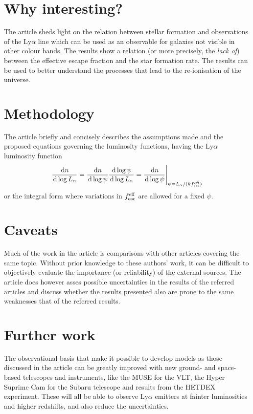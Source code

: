 \documentclass[a4paper,11pt]{article}
\newcommand{\diff}{\ensuremath{\; \text{d}}}
\begin{document}
\section{Why interesting?}
The article sheds light on the relation between stellar formation and observations of the Ly$\alpha$ line which can be used as an observable for galaxies not visible in other colour bands. The results show a relation (or more precisely, the \textit{lack of}) between the effective escape fraction and the star formation rate. The results can be used to better understand the processes that lead to the re-ionisation of the universe. 


\section{Methodology}
The article briefly and concisely describes the assumptions made and the proposed equations governing the luminosity functions, having the Ly$\alpha$ luminosity function
\begin{equation}
    \frac{\!\diff n}{\!\diff \log L_\alpha} = \frac{\!\diff n}{\!\diff \log \psi} \frac{\! \diff \log \psi}{\! \diff \log L_\alpha} = \frac{\! \diff n}{\!\diff \log \psi}\Bigg|_{\psi=L_\alpha / (kf_{\rm esc}^{\rm eff})}
    \label{eq:lumfunc}
\end{equation}
or the integral form where variations in $f_{\rm esc}^{\rm eff}$ are allowed for a fixed $\psi$. 

\section{Caveats}
Much of the work in the article is comparisons with other articles covering the same topic. Without prior knowledge to these authors' work, it can be difficult to objectively evaluate the importance (or reliability) of the external sources. The article does however asses possible uncertainties in the results of the referred articles and discuss whether the results presented also are prone to the same weaknesses that of the referred results.

\section{Further work}
The observational basis that make it possible to develop models as those discussed in the article can be greatly improved with new ground- and space-based telescopes and instruments, like the MUSE for the VLT, the Hyper Suprime Cam for the Subaru telescope and results from the HETDEX experiment. These will all be able to observe Ly$\alpha$ emitters at fainter luminosities and higher redshifts, and also reduce the uncertainties.





\end{document}
